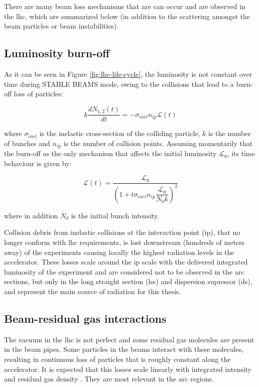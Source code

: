 \documentclass[encoding=utf8,british]{tumphthesis}
\begin{document}
There are many beam loss mechanisms that are can occur and are observed in the \acrshort{lhc}, which are summarized below (in addition to the scattering amongst the beam particles or beam instabilities).

\subsection{Luminosity burn-off}
As it can be seen in Figure \ref{fig:lhc-life-cycle}, the luminosity is not constant over time during STABLE BEAMS mode, owing to the collisions that lead to a burn-off loss of particles:

\begin{equation}
    k \frac{dN_{1,2}(t)}{dt} = - \sigma_{inel} n_{ip} \mathcal{L}(t)
\end{equation}

where $\sigma_{inel}$ is the inelastic cross-section of the colliding particle, $k$ is the number of bunches and $n_{ip}$ is the number of collision points. Assuming momentarily that the burn-off as the only mechanism that affects the initial luminosity $\mathcal{L}_0$, its time behaviour \cite{Giovannozzi:1742039} is given by:

\begin{equation}
    \mathcal{L}(t) = \frac{\mathcal{L}_0}{\left( 1 + t \sigma_{inel} n_{ip} \dfrac{\mathcal{L}_0}{N_0 k} \right)^2}
\end{equation}

where in addition $N_0$ is the initial bunch intensity.

Collision debris from inelastic collisions at the interaction point (\acrshort{ip}), that no longer conform with \acrshort{lhc} requirements, is lost downstream (hundreds of meters away) of the experiments causing locally the highest radiation levels in the accelerator. These losses scale around the \acrshort{ip} scale with the delivered integrated luminosity of the experiment \cite{Kacper-Stein-paper} and are considered not to be observed in the arc sections, but only in the long straight section (\acrshort{lss}) and dispersion supressor (\acrshort{ds}), and represent the main source of radiation for this thesis.


\subsection{Beam-residual gas interactions}
The vacuum in the \acrshort{lhc} is not perfect and some residual gas molecules are present in the beam pipes. Some particles in the beams interact with these molecules, resulting in continuous loss of particles that is roughly constant along the accelerator. It is expected that this losses scale linearly with integrated intensity and residual gas density \cite{Kacper-Stein-paper}. They are most relevant in the arc regions.
\end{document}
